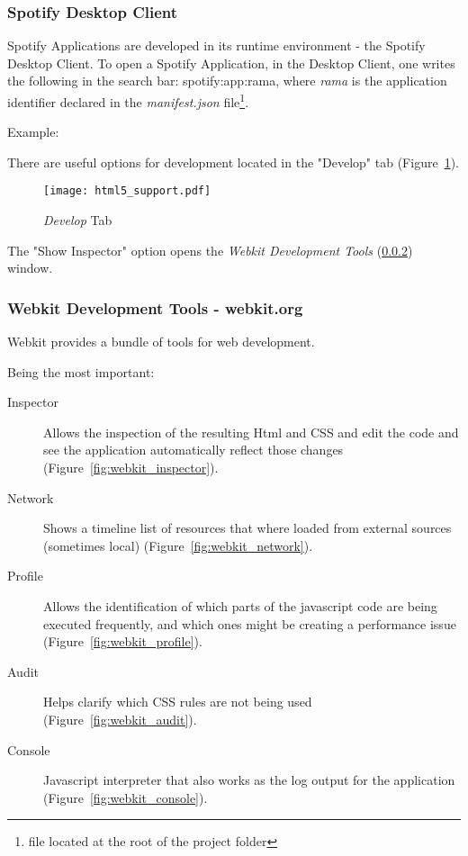 
    \subsubsection{Spotify Desktop Client} %
    \label{ssub:subsection_name}
      Spotify Applications are developed in its runtime environment - the Spotify Desktop Client.
      To open a Spotify Application, in the Desktop Client, one writes the following in the search bar: spotify:app:rama, where \emph{rama} is the application identifier declared in the \emph{manifest.json} file\footnote{file located at the root of the project folder}.

      Example:

      

      There are useful options for development located in the "Develop" tab (Figure~\ref{fig:html5_support}).

      \begin{figure}[H]
        \begin{center}
          \texttt{[image: html5\_support.pdf]}
        \end{center}
        \caption{\emph{Develop} Tab}
        \label{fig:html5_support}
      \end{figure}

      The "Show Inspector" option opens the \emph{Webkit Development Tools} (\ref{ssub:webkit_tools}) window.

    \subsubsection{Webkit Development Tools - webkit.org} %
    \label{ssub:webkit_tools}

      Webkit provides a bundle of tools for web development.

      Being the most important:

      \begin{description}
        \item[Inspector] Allows the inspection of the resulting Html and CSS and edit the code and see the application automatically reflect those changes (Figure~\ref{fig:webkit_inspector}).
        \item[Network] Shows a timeline list of resources that where loaded from external sources (sometimes local) (Figure~\ref{fig:webkit_network}).
        \item[Profile] Allows the identification of which parts of the javascript code are being executed frequently, and which ones might be creating a performance issue (Figure~\ref{fig:webkit_profile}).
        \item[Audit] Helps clarify which CSS rules are not being used (Figure~\ref{fig:webkit_audit}).
        \item[Console] Javascript interpreter that also works as the log output for the application (Figure~\ref{fig:webkit_console}).
      \end{description}


